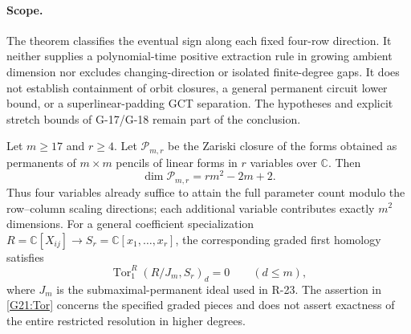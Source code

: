 \paragraph{Scope.}
The theorem classifies the eventual sign along each fixed
four-row direction. It neither supplies a polynomial-time
positive extraction rule in growing ambient dimension nor
excludes changing-direction or isolated finite-degree gaps.
It does not establish containment of orbit closures, a general
permanent circuit lower bound, or a superlinear-padding GCT
separation. The hypotheses and explicit stretch bounds of
G-17/G-18 remain part of the conclusion.


\begin{theorem}
\label{G-21}
Let $m\ge17$ and $r\ge4$. Let $\mathcal P_{m,r}$ be the
Zariski closure of the forms obtained as permanents of
$m\times m$ pencils of linear forms in $r$ variables over
$\mathbb C$. Then
\begin{equation}\label{G21:dimension}
 \dim\mathcal P_{m,r}=rm^2-2m+2.
\end{equation}
Thus four variables already suffice to attain the full
parameter count modulo the row--column scaling directions;
each additional variable contributes exactly $m^2$ dimensions.
For a general coefficient specialization
$R=\mathbb C[X_{ij}]\longrightarrow S_r=\mathbb C[x_1,\ldots,x_r]$,
the corresponding graded first homology satisfies
\begin{equation}\label{G21:Tor}
 \operatorname{Tor}_1^R(R/J_m,S_r)_d=0
 \qquad(d\le m),
\end{equation}
where $J_m$ is the submaximal-permanent ideal used in R-23.
The assertion in \eqref{G21:Tor} concerns the specified graded
pieces and does not assert exactness of the entire restricted
resolution in higher degrees.
\end{theorem}

